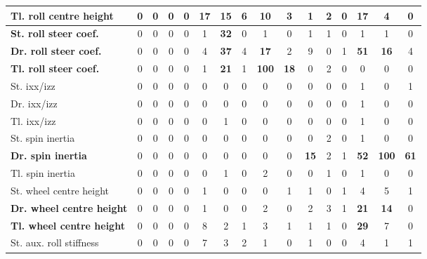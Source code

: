 \begin{table}[H]
\begin{tabular}{|l|c|c|c|c|c|c|c|c|c|c|c|c|c|c|c|}
    \hline
    \textbf{Tl. roll centre height} & 0 & 0 & 0 & 0 & \textbf{17} & \textbf{15} & 6 & \textbf{10} & 3 & 1 & 2 & 0 & \textbf{17} & 4 & 0 \\
    \hline
    \textcolor[rgb]{0.000, 0.620, 0.451}{\textbf{St. roll steer coef.}} & 0 & 0 & 0 & 0 & 1 & \textcolor[rgb]{0.000, 0.620, 0.451}{\textbf{32}} & 0 & 1 & 0 & 1 & 1 & 0 & 1 & 1 & 0 \\
    \hline
    \textcolor[rgb]{0.000, 0.447, 0.698}{\textbf{Dr. roll steer coef.}} & 0 & 0 & 0 & 0 & 4 & \textcolor[rgb]{0.000, 0.620, 0.451}{\textbf{37}} & 4 & \textbf{17} & 2 & 9 & 0 & 1 & \textcolor[rgb]{0.000, 0.447, 0.698}{\textbf{51}} & \textbf{16} & 4 \\
    \hline
    \textcolor[rgb]{0.851, 0.373, 0.008}{\textbf{Tl. roll steer coef.}} & 0 & 0 & 0 & 0 & 1 & \textbf{21} & 1 & \textcolor[rgb]{0.835, 0.369, 0.000}{\textbf{100}} & \textbf{18} & 0 & 2 & 0 & 0 & 0 & 0 \\
    \hline
    St. \gls{ixx}/\gls{izz} & 0 & 0 & 0 & 0 & 0 & 0 & 0 & 0 & 0 & 0 & 0 & 0 & 1 & 0 & 1 \\
    \hline
    Dr. \gls{ixx}/\gls{izz} & 0 & 0 & 0 & 0 & 0 & 0 & 0 & 0 & 0 & 0 & 0 & 0 & 1 & 0 & 0 \\
    \hline
    Tl. \gls{ixx}/\gls{izz} & 0 & 0 & 0 & 0 & 0 & 1 & 0 & 0 & 0 & 0 & 0 & 0 & 1 & 0 & 0 \\
    \hline
    St. spin inertia & 0 & 0 & 0 & 0 & 0 & 0 & 0 & 0 & 0 & 0 & 2 & 0 & 1 & 0 & 0 \\
    \hline
    \textcolor[rgb]{0.851, 0.373, 0.008}{\textbf{Dr. spin inertia}} & 0 & 0 & 0 & 0 & 0 & 0 & 0 & 0 & 0 & \textbf{15} & 2 & 1 & \textcolor[rgb]{0.000, 0.447, 0.698}{\textbf{52}} & \textcolor[rgb]{0.835, 0.369, 0.000}{\textbf{100}} & \textcolor[rgb]{0.000, 0.447, 0.698}{\textbf{61}} \\
    \hline
    Tl. spin inertia & 0 & 0 & 0 & 0 & 0 & 1 & 0 & 2 & 0 & 0 & 1 & 0 & 1 & 0 & 0 \\
    \hline
    St. wheel centre height & 0 & 0 & 0 & 0 & 1 & 0 & 0 & 0 & 1 & 1 & 0 & 1 & 4 & 5 & 1 \\
    \hline
    \textbf{Dr. wheel centre height} & 0 & 0 & 0 & 0 & 1 & 0 & 0 & 2 & 0 & 2 & 3 & 1 & \textbf{21} & \textbf{14} & 0 \\
    \hline
    \textcolor[rgb]{0.000, 0.620, 0.451}{\textbf{Tl. wheel centre height}} & 0 & 0 & 0 & 0 & 8 & 2 & 1 & 3 & 1 & 1 & 1 & 0 & \textcolor[rgb]{0.000, 0.620, 0.451}{\textbf{29}} & 7 & 0 \\
    \hline
    St. aux. roll stiffness & 0 & 0 & 0 & 0 & 7 & 3 & 2 & 1 & 0 & 1 & 0 & 0 & 4 & 1 & 1 \\

\end{tabular}
\end{table}
